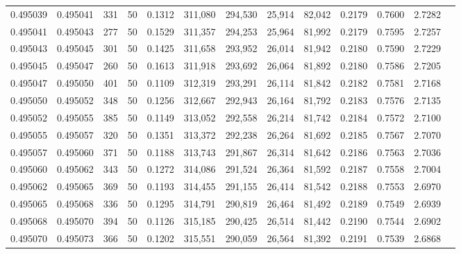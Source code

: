 \begin{tabular}{rrrrrrrrrrrrr}
0.495039 & 0.495041 &   331 &  50 &                                     0.1312 & 311,080 & 294,530 &  25,914 &  82,042 & 0.2179 & 0.7600 & 2.7282 \\
0.495041 & 0.495043 &   277 &  50 &                                     0.1529 & 311,357 & 294,253 &  25,964 &  81,992 & 0.2179 & 0.7595 & 2.7257 \\
0.495043 & 0.495045 &   301 &  50 &                                     0.1425 & 311,658 & 293,952 &  26,014 &  81,942 & 0.2180 & 0.7590 & 2.7229 \\
0.495045 & 0.495047 &   260 &  50 &                                     0.1613 & 311,918 & 293,692 &  26,064 &  81,892 & 0.2180 & 0.7586 & 2.7205 \\
0.495047 & 0.495050 &   401 &  50 &                                     0.1109 & 312,319 & 293,291 &  26,114 &  81,842 & 0.2182 & 0.7581 & 2.7168 \\
0.495050 & 0.495052 &   348 &  50 &                                     0.1256 & 312,667 & 292,943 &  26,164 &  81,792 & 0.2183 & 0.7576 & 2.7135 \\
0.495052 & 0.495055 &   385 &  50 &                                     0.1149 & 313,052 & 292,558 &  26,214 &  81,742 & 0.2184 & 0.7572 & 2.7100 \\
0.495055 & 0.495057 &   320 &  50 &                                     0.1351 & 313,372 & 292,238 &  26,264 &  81,692 & 0.2185 & 0.7567 & 2.7070 \\
0.495057 & 0.495060 &   371 &  50 &                                     0.1188 & 313,743 & 291,867 &  26,314 &  81,642 & 0.2186 & 0.7563 & 2.7036 \\
0.495060 & 0.495062 &   343 &  50 &                                     0.1272 & 314,086 & 291,524 &  26,364 &  81,592 & 0.2187 & 0.7558 & 2.7004 \\
0.495062 & 0.495065 &   369 &  50 &                                     0.1193 & 314,455 & 291,155 &  26,414 &  81,542 & 0.2188 & 0.7553 & 2.6970 \\
0.495065 & 0.495068 &   336 &  50 &                                     0.1295 & 314,791 & 290,819 &  26,464 &  81,492 & 0.2189 & 0.7549 & 2.6939 \\
0.495068 & 0.495070 &   394 &  50 &                                     0.1126 & 315,185 & 290,425 &  26,514 &  81,442 & 0.2190 & 0.7544 & 2.6902 \\
0.495070 & 0.495073 &   366 &  50 &                                     0.1202 & 315,551 & 290,059 &  26,564 &  81,392 & 0.2191 & 0.7539 & 2.6868 \\

\end{tabular}
